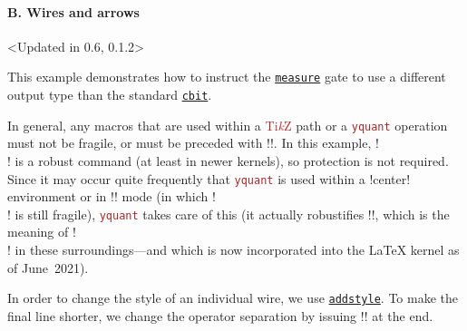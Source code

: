 \documentclass{scrartcl}
\makeatletter
\newenvironment{codeexample*}{%
   \VerbatimEnvironment%
   \let\FVB@VerbatimOut\minted@FVB@VerbatimOut
   \let\FVE@VerbatimOut\minted@FVE@VerbatimOut
   \minted@configlang{tex}%
   \minted@fvset
   \begin{VerbatimOut}[codes={\catcode`\^^I=12},firstline,lastline]{\minted@jobname.pyg}%
}{
   \end{VerbatimOut}%
   \minted@langlinenoson%
   \begin{adjustbox}{center}
       \minted@jobname.pyg %
   \end{adjustbox}\nopagebreak
   \expandafter\minted@pygmentize\expandafter{\minted@lang}%
   \minted@langlinenosoff%
   \par%
}
\def\TikZ{\textcolor{brown}{Ti\textit kZ}}
\def\pkg#1{\textcolor{brown}{\texttt{#1}}}
\def\gate#1{\hyperref[gate:#1]{\texttt{#1}}}
\def\Yquant{\pkg{yquant}}
\makeatother
\begin{document}
            \paragraph{B. Wires and arrows}\leavevmode
               \begin{example}<Updated in 0.6, 0.1.2>
                  \begin{codeexample*}
                  \end{codeexample*}
                  This example demonstrates how to instruct the \gate{measure} gate to use a different output type than the standard \gate{cbit}.

                  In general, any macros that are used within a \TikZ{} path or a \Yquant{} operation must not be fragile, or must be preceded with \tex!\protect!.
                  In this example, \tex!\\! is a robust command (at least in newer kernels), so protection is not required.
                  Since it may occur quite frequently that \Yquant{} is used within a \tex!center! environment or in \tex!\centering! mode (in which \tex!\\! is still fragile), \Yquant{} takes care of this (it actually robustifies \tex!\@centercr!, which is the meaning of \tex!\\! in these surroundings---and which is now incorporated into the \LaTeX{} kernel as of June~2021).

                  In order to change the style of an individual wire, we use \gate{addstyle}.
                  To make the final line shorter, we change the operator separation by issuing \tex!\yquantset! at the end.
               \end{example}
\end{document}

